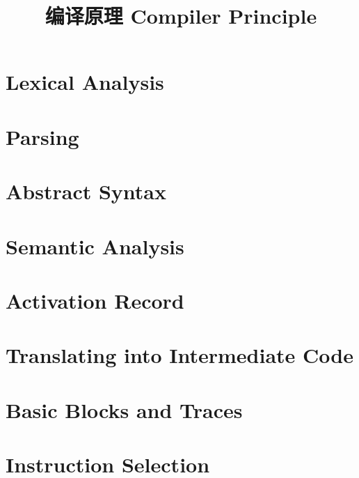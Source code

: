 \documentclass[UTF8, 10pt]{ctexart}
\date{}
\title{编译原理 Compiler Principle}
\begin{document}
\maketitle
\vspace*{-25mm}
\begin{multicols}{2}
\section{Lexical Analysis}
\label{section:lexical-analysis}

\section{Parsing}
\label{section:parsing}

\section{Abstract Syntax}
\label{section:abstract-syntax}

\section{Semantic Analysis}
\label{section:semantic-analysis}

\section{Activation Record}
\label{section:activation-record}

\section{Translating into Intermediate Code}
\label{section:ir}

\section{Basic Blocks and Traces}
\label{section:basic-blocks}

\section{Instruction Selection}
\label{section:instruction-section}


\end{multicols}
\end{document}
